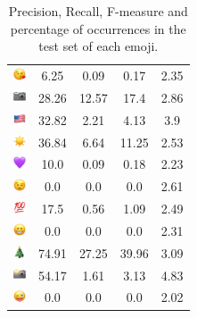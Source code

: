 \documentclass{article}
\begin{document}
\begin{table}
\begin{tabular}{|c|ccc|c|}
\includegraphics[height=0.37cm,width=0.37cm]{img/face_blowing_a_kiss.png} & 6.25 & 0.09 & 0.17 & 2.35\\ 
\includegraphics[height=0.37cm,width=0.37cm]{img/camera.png} & 28.26 & 12.57 & 17.4 & 2.86\\ 
\includegraphics[height=0.37cm,width=0.37cm]{img/United_States.png} & 32.82 & 2.21 & 4.13 & 3.9\\ 
\includegraphics[height=0.37cm,width=0.37cm]{img/sun.png} & 36.84 & 6.64 & 11.25 & 2.53\\ 
\includegraphics[height=0.37cm,width=0.37cm]{img/purple_heart.png} & 10.0 & 0.09 & 0.18 & 2.23\\ 
\includegraphics[height=0.37cm,width=0.37cm]{img/winking_face.png} & 0.0 & 0.0 & 0.0 & 2.61\\ 
\includegraphics[height=0.37cm,width=0.37cm]{img/hundred_points.png} & 17.5 & 0.56 & 1.09 & 2.49\\ 
\includegraphics[height=0.37cm,width=0.37cm]{img/beaming_face_with_smiling_eyes.png} & 0.0 & 0.0 & 0.0 & 2.31\\ 
\includegraphics[height=0.37cm,width=0.37cm]{img/Christmas_tree.png} & 74.91 & 27.25 & 39.96 & 3.09\\ 
\includegraphics[height=0.37cm,width=0.37cm]{img/camera_with_flash.png} & 54.17 & 1.61 & 3.13 & 4.83\\ 
\includegraphics[height=0.37cm,width=0.37cm]{img/winking_face_with_tongue.png} & 0.0 & 0.0 & 0.0 & 2.02\\ 

\hline
\end{tabular}
\caption{\label{table:emoji_detailed} Precision, Recall, F-measure and percentage of occurrences in the test set of each emoji.}
\end{table}
\end{document}
